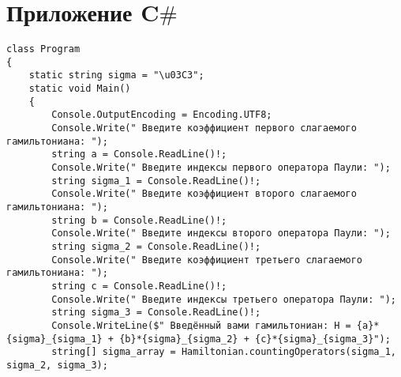 \documentclass[a4paper]{report}
\begin{document}
\newpage
{}


\chapter*{Приложение {\huge C{$\#$}}}

\begin{lstlisting}
class Program
{
	static string sigma = "\u03C3";
	static void Main()
	{
		Console.OutputEncoding = Encoding.UTF8;
		Console.Write(" Введите коэффициент первого слагаемого гамильтониана: ");
		string a = Console.ReadLine()!;
		Console.Write(" Введите индексы первого оператора Паули: ");
		string sigma_1 = Console.ReadLine()!;
		Console.Write(" Введите коэффициент второго слагаемого гамильтониана: ");
		string b = Console.ReadLine()!;
		Console.Write(" Введите индексы второго оператора Паули: ");
		string sigma_2 = Console.ReadLine()!;
		Console.Write(" Введите коэффициент третьего слагаемого гамильтониана: ");
		string c = Console.ReadLine()!;
		Console.Write(" Введите индексы третьего оператора Паули: ");
		string sigma_3 = Console.ReadLine()!;
		Console.WriteLine($" Введённый вами гамильтониан: H = {a}*{sigma}_{sigma_1} + {b}*{sigma}_{sigma_2} + {c}*{sigma}_{sigma_3}");
		string[] sigma_array = Hamiltonian.countingOperators(sigma_1, sigma_2, sigma_3);


\end{lstlisting}
\end{document}
